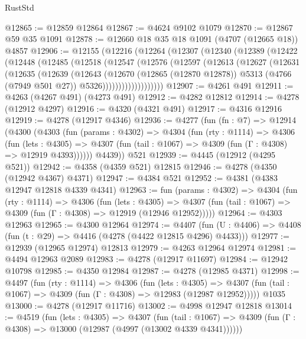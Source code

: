 \begin{lexlean}{RustStd}
\begin{coremodule}
{\begin{coremodule}
{{{{{{{{{{{{{{{{{{{{{{{{{{{{{{{{{{{@12865 := @12859 @12864
@12867 := @4624 @9102 @1079
@12870 := @12867 @59 @35 @1091
@12878 := @12660 @18 @35 @18 @1091 (@4707 (@12665 @18)) @4857
@12906 := @12155
    (@12216
      (@12264
        (@12307
          (@12340
            (@12389
              (@12422
                (@12448
                  (@12485
                    (@12518
                      (@12547
                        (@12576
                          (@12597
                            (@12613
                              (@12627
                                (@12631
                                  (@12635
                                    (@12639
                                      (@12643
                                        (@12670
                                          (@12865 (@12870 @12878))
                                          @5313
                                          (@4766 (@7949 @501 @27))
                                          @5326)))))))))))))))))))
@12907 := @4261 @491
@12911 := @4263 (@4267 @491) (@4273 @491)
@12912 := @4282 @12812
@12914 := @4278 (@12912 @4297)
@12916 := @4320 (@4321 @491)
@12917 := @4316 @12916
@12919 := @4278 (@12917 @4346)
@12936 := @4277
    (fun (fn : @7) =>
    @12914
      (@4300
        (@4303
          (fun (params : @4302) =>
          @4304
            (fun (rty : @1114) =>
            @4306
              (fun (lets : @4305) =>
              @4307 (fun (tail : @1067) => @4309 (fun (Γ : @4308) => @12919 @4393))))))
        @4439))
    @521
@12939 := @4445 (@12912 (@4295 @521))
@12942 := @4358 (@4359 @521) @12815
@12946 := @4278 (@4350 (@12942 @4367) @4371)
@12947 := @4384 @521
@12952 := @4381 (@4383 @12947 @12818 @4339 @4341)
@12963 := fun (params : @4302) =>
  @4304
    (fun (rty : @1114) =>
    @4306
      (fun (lets : @4305) =>
      @4307 (fun (tail : @1067) => @4309 (fun (Γ : @4308) => @12919 (@12946 @12952)))))
@12964 := @4303 @12963
@12965 := @4300 @12964
@12974 := @4407
    (fun (U : @4406) => @4408 (fun (t : @29) => @4416 (@4278 (@4422 @12815 @4296) @4433)))
@12977 := @12939 (@12965 @12974) @12813
@12979 := @4263 @12964 @12974
@12981 := @4494 @12963 @2089
@12983 := @4278 (@12917 @11697)
@12984 := @12942 @10798
@12985 := @4350 @12984
@12987 := @4278 (@12985 @4371)
@12998 := @4497
    (fun (rty : @1114) =>
    @4306
      (fun (lets : @4305) =>
      @4307 (fun (tail : @1067) => @4309 (fun (Γ : @4308) => @12983 (@12987 @12952)))))
    @1035
@13000 := @4278 (@12917 @11716)
@13002 := @4998 @12947 @12818
@13014 := @4519
    (fun (lets : @4305) =>
    @4307
      (fun (tail : @1067) =>
      @4309 (fun (Γ : @4308) => @13000 (@12987 (@4997 (@13002 @4339 @4341))))))
}}}}}}}}}}}}}}}}}}}}}}}}}}}}}}}}}}}
\end{coremodule}}
\end{coremodule}
\end{lexlean}
